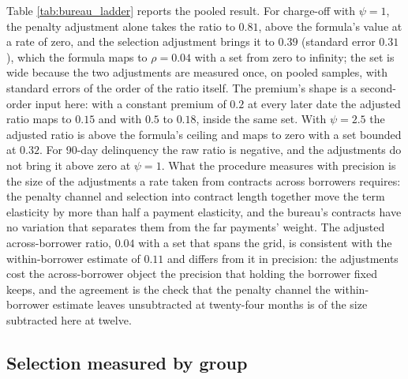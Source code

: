 Table \ref{tab:bureau_ladder} reports the pooled result. For charge-off with $\psi = 1$, the penalty adjustment alone takes the ratio to $0.81$, above the formula's value at a rate of zero, and the selection adjustment brings it to $0.39$ (standard error $0.31$), which the formula maps to $\rho = 0.04$ with a set from zero to infinity; the set is wide because the two adjustments are measured once, on pooled samples, with standard errors of the order of the ratio itself. The premium's shape is a second-order input here: with a constant premium of $0.2$ at every later date the adjusted ratio maps to $0.15$ and with $0.5$ to $0.18$, inside the same set. With $\psi = 2.5$ the adjusted ratio is above the formula's ceiling and maps to zero with a set bounded at $0.32$. For 90-day delinquency the raw ratio is negative, and the adjustments do not bring it above zero at $\psi = 1$. What the procedure measures with precision is the size of the adjustments a rate taken from contracts across borrowers requires: the penalty channel and selection into contract length together move the term elasticity by more than half a payment elasticity, and the bureau's contracts have no variation that separates them from the far payments' weight. The adjusted across-borrower ratio, $0.04$ with a set that spans the grid, is consistent with the within-borrower estimate of $0.11$ and differs from it in precision: the adjustments cost the across-borrower object the precision that holding the borrower fixed keeps, and the agreement is the check that the penalty channel the within-borrower estimate leaves unsubtracted at twenty-four months is of the size subtracted here at twelve.

\subsection{Selection measured by group}

